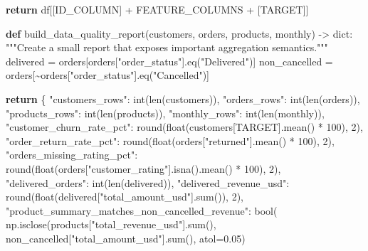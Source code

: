 \documentclass[
  indonesian,
  letterpaper,
  DIV=11,
  numbers=noendperiod]{scrreprt}
\newenvironment{Shaded}{\begin{snugshade}}{\end{snugshade}}
\newcommand{\BuiltInTok}[1]{\textcolor[rgb]{0.00,0.23,0.31}{#1}}
\newcommand{\CommentTok}[1]{\textcolor[rgb]{0.37,0.37,0.37}{#1}}
\newcommand{\ControlFlowTok}[1]{\textcolor[rgb]{0.00,0.23,0.31}{\textbf{#1}}}
\newcommand{\DecValTok}[1]{\textcolor[rgb]{0.68,0.00,0.00}{#1}}
\newcommand{\FloatTok}[1]{\textcolor[rgb]{0.68,0.00,0.00}{#1}}
\newcommand{\KeywordTok}[1]{\textcolor[rgb]{0.00,0.23,0.31}{\textbf{#1}}}
\newcommand{\NormalTok}[1]{\textcolor[rgb]{0.00,0.23,0.31}{#1}}
\newcommand{\OperatorTok}[1]{\textcolor[rgb]{0.37,0.37,0.37}{#1}}
\newcommand{\StringTok}[1]{\textcolor[rgb]{0.13,0.47,0.30}{#1}}
\begin{document}
\begin{Shaded}
\begin{Highlighting}[]
    \ControlFlowTok{return}\NormalTok{ df[[ID\_COLUMN] }\OperatorTok{+}\NormalTok{ FEATURE\_COLUMNS }\OperatorTok{+}\NormalTok{ [TARGET]]}


\KeywordTok{def}\NormalTok{ build\_data\_quality\_report(customers, orders, products, monthly) }\OperatorTok{{-}\textgreater{}} \BuiltInTok{dict}\NormalTok{:}
    \CommentTok{"""Create a small report that exposes important aggregation semantics."""}
\NormalTok{    delivered }\OperatorTok{=}\NormalTok{ orders[orders[}\StringTok{"order\_status"}\NormalTok{].eq(}\StringTok{"Delivered"}\NormalTok{)]}
\NormalTok{    non\_cancelled }\OperatorTok{=}\NormalTok{ orders[}\OperatorTok{\textasciitilde{}}\NormalTok{orders[}\StringTok{"order\_status"}\NormalTok{].eq(}\StringTok{"Cancelled"}\NormalTok{)]}

    \ControlFlowTok{return}\NormalTok{ \{}
        \StringTok{"customers\_rows"}\NormalTok{: }\BuiltInTok{int}\NormalTok{(}\BuiltInTok{len}\NormalTok{(customers)),}
        \StringTok{"orders\_rows"}\NormalTok{: }\BuiltInTok{int}\NormalTok{(}\BuiltInTok{len}\NormalTok{(orders)),}
        \StringTok{"products\_rows"}\NormalTok{: }\BuiltInTok{int}\NormalTok{(}\BuiltInTok{len}\NormalTok{(products)),}
        \StringTok{"monthly\_rows"}\NormalTok{: }\BuiltInTok{int}\NormalTok{(}\BuiltInTok{len}\NormalTok{(monthly)),}
        \StringTok{"customer\_churn\_rate\_pct"}\NormalTok{: }\BuiltInTok{round}\NormalTok{(}\BuiltInTok{float}\NormalTok{(customers[TARGET].mean() }\OperatorTok{*} \DecValTok{100}\NormalTok{), }\DecValTok{2}\NormalTok{),}
        \StringTok{"order\_return\_rate\_pct"}\NormalTok{: }\BuiltInTok{round}\NormalTok{(}\BuiltInTok{float}\NormalTok{(orders[}\StringTok{"returned"}\NormalTok{].mean() }\OperatorTok{*} \DecValTok{100}\NormalTok{), }\DecValTok{2}\NormalTok{),}
        \StringTok{"orders\_missing\_rating\_pct"}\NormalTok{: }\BuiltInTok{round}\NormalTok{(}\BuiltInTok{float}\NormalTok{(orders[}\StringTok{"customer\_rating"}\NormalTok{].isna().mean() }\OperatorTok{*} \DecValTok{100}\NormalTok{), }\DecValTok{2}\NormalTok{),}
        \StringTok{"delivered\_orders"}\NormalTok{: }\BuiltInTok{int}\NormalTok{(}\BuiltInTok{len}\NormalTok{(delivered)),}
        \StringTok{"delivered\_revenue\_usd"}\NormalTok{: }\BuiltInTok{round}\NormalTok{(}\BuiltInTok{float}\NormalTok{(delivered[}\StringTok{"total\_amount\_usd"}\NormalTok{].}\BuiltInTok{sum}\NormalTok{()), }\DecValTok{2}\NormalTok{),}
        \StringTok{"product\_summary\_matches\_non\_cancelled\_revenue"}\NormalTok{: }\BuiltInTok{bool}\NormalTok{(}
\NormalTok{            np.isclose(products[}\StringTok{"total\_revenue\_usd"}\NormalTok{].}\BuiltInTok{sum}\NormalTok{(), non\_cancelled[}\StringTok{"total\_amount\_usd"}\NormalTok{].}\BuiltInTok{sum}\NormalTok{(), atol}\OperatorTok{=}\FloatTok{0.05}\NormalTok{)}

\end{Highlighting}
\end{Shaded}
\end{document}
